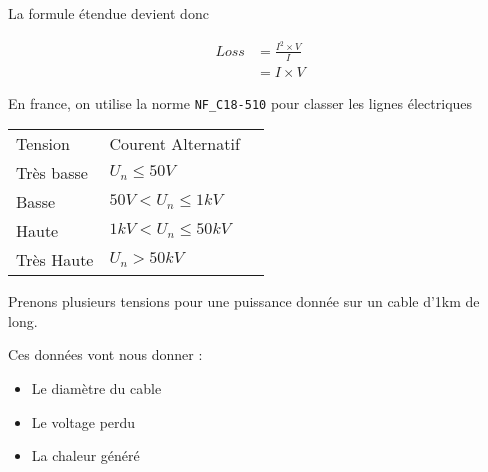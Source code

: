 La formule étendue devient donc

\begin{equation} \label{loss}
  \begin{aligned}
    Loss & = \frac{I^2\times V}{I} \\
         & = I \times V
  \end{aligned}
\end{equation}

En france, on utilise la norme \texttt{NF\_C18-510} pour classer les lignes électriques

\begin{table}[h]
  \begin{tabular}{lll}
    Tension    & Courent Alternatif     \\
    Très basse & $U_n \leq 50V$         \\
    Basse      & $50V < U_n \leq 1kV$   \\
    Haute      & $1kV < U_n \leq 50kV$  \\
    Très Haute & $U_n > 50kV$
  \end{tabular}
\end{table}


Prenons plusieurs tensions pour une puissance donnée sur un cable d'1km de long.

Ces données vont nous donner :
\begin{itemize}
  \item Le diamètre du cable
  \item Le voltage perdu
  \item La chaleur généré
\end{itemize}

